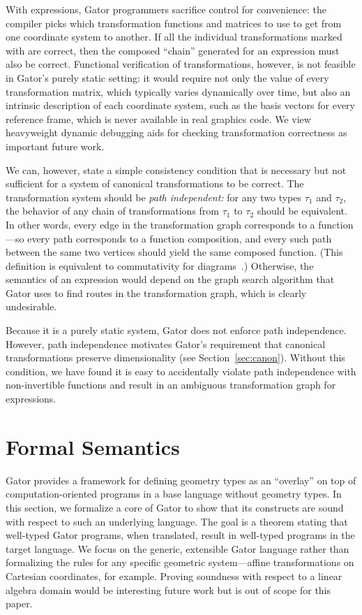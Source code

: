 \documentclass[../main.tex]{subfiles}
\begin{document}
With  expressions, Gator programmers sacrifice control for convenience:
the compiler picks which transformation functions and matrices to use to get from one coordinate system to another.
%
If all the individual transformations marked with  are correct, then the composed ``chain'' generated for an  expression must also be correct.
%
Functional verification of transformations, however, is not feasible in Gator's purely static setting:
it would require not only the value of every transformation matrix, which typically varies dynamically over time,
but also an intrinsic description of each coordinate system, such as the basis vectors for every reference frame, which is never available in real graphics code.
%
We view heavyweight dynamic debugging aids for checking transformation correctness as important future work.

We can, however, state a simple consistency condition that is necessary but not sufficient for a system of canonical transformations to be correct.
%
The transformation system should be \emph{path independent:}
for any two types $\tau_1$ and $\tau_2$, the behavior of any chain of transformations from $\tau_1$ to $\tau_2$ should be equivalent.
%
In other words, every edge in the transformation graph corresponds to a function---so every path corresponds to a function composition,
and every such path between the same two vertices should yield the same composed function.
%
(This definition is equivalent to commutativity for diagrams~\cite{murota}.)
%
Otherwise, the semantics of an expression  would depend on the graph search algorithm that Gator uses to find routes in the transformation graph, which is clearly undesirable.

Because it is a purely static system, Gator does not enforce path independence.
%
However, path independence motivates Gator's requirement that canonical transformations preserve dimensionality (see Section~\ref{sec:canon}).
%
Without this condition, we have found it is easy to accidentally violate path independence with non-invertible functions and result in an ambiguous transformation graph for  expressions.
\section{Formal Semantics}
\label{sec:semantics}

\newcommand{\targlang}{Hatchling\xspace}

Gator provides a framework for defining geometry types as an ``overlay'' on top of computation-oriented programs in a base language without geometry types.
In this section, we formalize a core of Gator to show that its constructs are sound with respect to such an underlying language.
The goal is a theorem stating that well-typed Gator programs, when translated, result in well-typed programs in the target language.
We focus on the generic, extensible Gator language rather than formalizing the rules for any specific geometric system---affine transformations on Cartesian coordinates, for example.
Proving soundness with respect to a linear algebra domain would be interesting future work but is out of scope for this paper.
\end{document}
